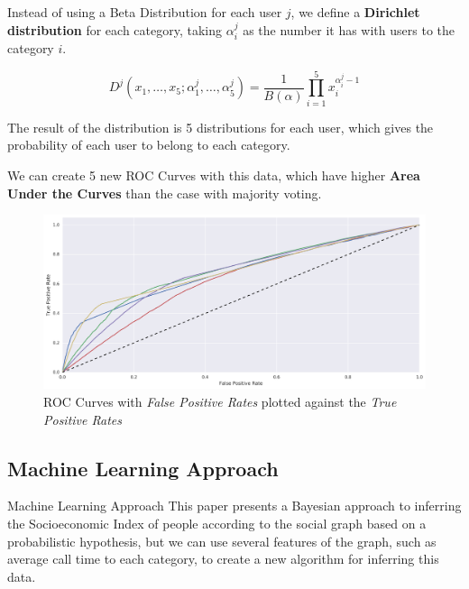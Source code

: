 \documentclass{beamer}
\newcommand{\Beta}{B}
\begin{document}
\begin{frame}
	Instead of using a Beta Distribution for each user \( j \), we define a \textbf{Dirichlet distribution} for each category, taking \( \alpha^j_i \) as the number it has with users to the category \( i \).

	\[
		D^j \left( x_1, \ldots, x_5; \alpha^j_1, \ldots, \alpha^j_5 \right) = \frac{1}{\Beta(\alpha)} \prod^5_{i = 1}{x_i^{\alpha^j_i - 1}}
	\]

	\pause{}

	The result of the distribution is 5 distributions for each user, which gives the probability of each user to belong to each category.
\end{frame}

\begin{frame}
	We can create 5 new ROC Curves with this data, which have higher \textbf{Area Under the Curves} than the case with majority voting.

	\begin{figure}
		\includegraphics[height=.6\textheight]{figures/ROC_multiclass_wide.png}
		\caption{ROC Curves with \textit{False Positive Rates} plotted against the \textit{True Positive Rates}}
	\end{figure}
\end{frame}

\subsection{Machine Learning Approach}
\begin{frame}{Machine Learning Approach}
	This paper presents a Bayesian approach to inferring the Socioeconomic Index of people according to the social graph based on a probabilistic hypothesis, but we can use several features of the graph, such as average call time to each category, to create a new algorithm for inferring this data.
\end{frame}
\end{document}
